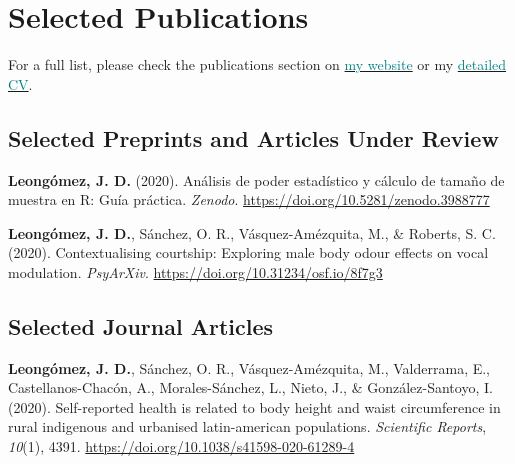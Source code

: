 \documentclass[11pt, a4paper]{awesome-cv}
\begin{document}
\hypertarget{selected-publications}{%
\section{Selected Publications}\label{selected-publications}}

For a full list, please check the publications section on
\href{https://jdleongomez.info/en/publication/}{\textcolor{teal}{my website}}
or my
\href{https://jdleongomez.info/en/files/jdl_cv_en.pdf}{\textcolor{teal}{detailed CV}}.

\hypertarget{selected-preprints-and-articles-under-review}{%
\subsection{Selected Preprints and Articles Under
Review}\label{selected-preprints-and-articles-under-review}}

\begingroup
\setlength{\parindent}{-0.5in}
\setlength{\leftskip}{0.5in}

\hypertarget{refs_featured_preprint}{}
\leavevmode\hypertarget{ref-Leongomez2020a}{}%
\textbf{Leongómez, J. D.} (2020). {Análisis de poder estadístico y
cálculo de tamaño de muestra en R: Guía práctica}. \emph{Zenodo}.
\url{https://doi.org/10.5281/zenodo.3988777}

\leavevmode\hypertarget{ref-Leongomez2020}{}%
\textbf{Leongómez, J. D.}, Sánchez, O. R., Vásquez-Amézquita, M., \&
Roberts, S. C. (2020). Contextualising courtship: Exploring male body
odour effects on vocal modulation. \emph{PsyArXiv}.
\url{https://doi.org/10.31234/osf.io/8f7g3}

\endgroup

\hypertarget{selected-journal-articles}{%
\subsection{Selected Journal Articles}\label{selected-journal-articles}}

\begingroup
\setlength{\parindent}{-0.5in}
\setlength{\leftskip}{0.5in}

\hypertarget{refs_featured}{}
\leavevmode\hypertarget{ref-Leonguxf3mez2020}{}%
\textbf{Leongómez, J. D.}, Sánchez, O. R., Vásquez-Amézquita, M.,
Valderrama, E., Castellanos-Chacón, A., Morales-Sánchez, L., Nieto, J.,
\& González-Santoyo, I. (2020). Self-reported health is related to body
height and waist circumference in rural indigenous and urbanised
latin-american populations. \emph{Scientific Reports}, \emph{10}(1),
4391. \url{https://doi.org/10.1038/s41598-020-61289-4}
\end{document}
